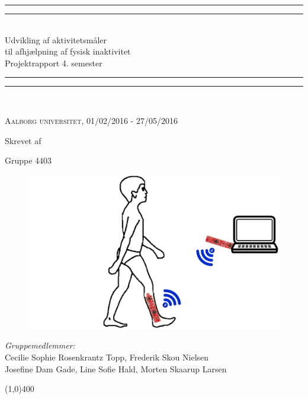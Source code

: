 \begin{center}
	\vspace*{\baselineskip}
	\rule{\textwidth}{1.6pt}\vspace*{-\baselineskip}\vspace*{2pt} %
	\rule{\textwidth}{0.4pt}\\[\baselineskip] %
	
	{\huge Udvikling af aktivitetsmåler\\\hspace*{2ex} til afhjælpning af fysisk inaktivitet \\[0.5\baselineskip] \large Projektrapport 4. semester}\\[0.2\baselineskip] %
	
	\rule{\textwidth}{0.4pt}\vspace*{-\baselineskip}\vspace{3.2pt} %
	\rule{\textwidth}{1.6pt}\\[\baselineskip] %
	\vspace*{3\baselineskip}
	
	\scshape %
	Aalborg universitet,  01/02/2016 - 27/05/2016 \par %
	
	\vspace*{2\baselineskip} %
	
	Skrevet af \\
	{\Large Gruppe 4403\par}
\end{center} %
\begin{figure}[H]
	\centering
	\begin{minipage}[c]{1\textwidth}
		\includegraphics[width=.75\textwidth]{figures/forside2.PNG}
	\end{minipage}
	\hfill
\end{figure}

\vspace*{\fill}
\begin{center}
	\textit{Gruppemedlemmer:}\\
	Cecilie Sophie Rosenkrantz Topp, Frederik Skou Nielsen \\
	Josefine Dam Gade, Line Sofie Hald, Morten Skaarup Larsen
\end{center}
\begin{center}
	\line(1,0){400}
\end{center}